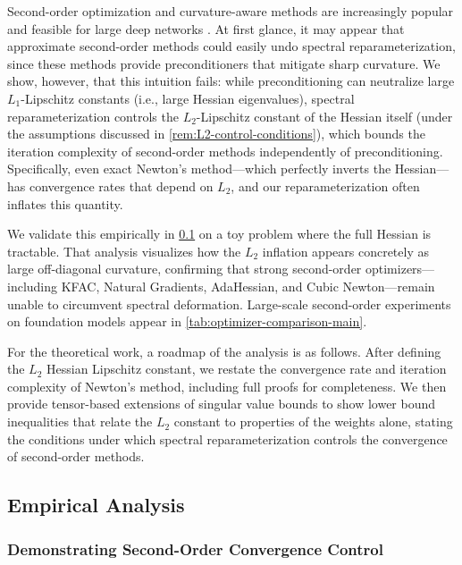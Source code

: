 \documentclass{article}
\theoremstyle{plain}
\theoremstyle{definition}
\theoremstyle{remark}
\begin{document}
Second-order optimization and curvature-aware methods are increasingly popular and feasible for large deep networks \citep{liusophia,yao2021adahessian}. At first glance, it may appear that approximate second-order methods could easily undo spectral reparameterization, since these methods provide preconditioners that mitigate sharp curvature. We show, however, that this intuition fails: while preconditioning can neutralize large $L_1$-Lipschitz constants (i.e., large Hessian eigenvalues), spectral reparameterization controls the $L_2$-Lipschitz constant of the Hessian itself (under the assumptions discussed in \cref{rem:L2-control-conditions}), which bounds the iteration complexity of second-order methods independently of preconditioning. Specifically, even exact Newton's method---which perfectly inverts the Hessian---has convergence rates that depend on $L_2$, and our reparameterization often inflates this quantity.

We validate this empirically in \cref{app:second_order_toy_empirical_analysis} on a toy problem where the full Hessian is tractable. That analysis visualizes how the $L_2$ inflation appears concretely as large off-diagonal curvature, confirming that strong second-order optimizers---including KFAC, Natural Gradients, AdaHessian, and Cubic Newton---remain unable to circumvent spectral deformation. Large-scale second-order experiments on foundation models appear in \cref{tab:optimizer-comparison-main}.

For the theoretical work, a roadmap of the analysis is as follows. After defining the $L_2$ Hessian Lipschitz constant, we restate the convergence rate and iteration complexity of Newton's method, including full proofs for completeness. We then provide tensor-based extensions of singular value bounds to show lower bound inequalities that relate the $L_2$ constant to properties of the weights alone, stating the conditions under which spectral reparameterization controls the convergence of second-order methods.

\subsection{Empirical Analysis}
\label{app:second_order_toy_empirical_analysis}

\subsubsection{Demonstrating Second-Order Convergence Control}
\end{document}
